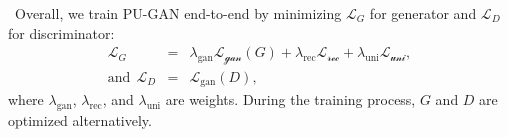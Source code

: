 
 \
Overall, we train PU-GAN end-to-end by minimizing $\mathcal{L}_G$ for generator and  $\mathcal{L}_D$ for discriminator:
\begin{eqnarray}
\label{eq:compound}
	\mathcal{L}_G&=& \lambda_{\text{gan}}\mathcal{L_{\text{gan}}}(G) +\lambda_{\text{rec}}\mathcal{L_{\text{rec}}} + \lambda_{\text{uni}}\mathcal{L_{\text{uni}}}, \\
	\text{and} \ \
    \mathcal{L}_D&=&\mathcal{L}_{\text{gan}}(D),
\end{eqnarray}
where $\lambda_{\text{gan}}$, $\lambda_{\text{rec}}$, and $\lambda_{\text{uni}}$ are weights.
During the training process, $G$ and $D$ are optimized alternatively.

